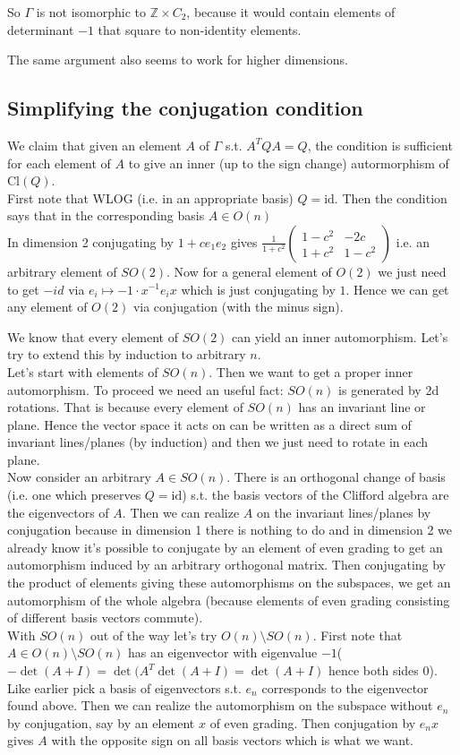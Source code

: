 \documentclass[a4paper]{article}
\begin{document}
So $\Gamma$ is not isomorphic to $\mathbb{Z} \times C_2$, because it would contain elements of determinant $-1$ that square to non-identity elements.

The same argument also seems to work for higher dimensions.

\subsection*{Simplifying the conjugation condition}
We claim that given an element $A$ of $\Gamma$ s.t. $A^{T}QA=Q$, the condition is sufficient for each element of $A$ to give an inner (up to the sign change) autormorphism of $\text{Cl}\left( Q \right)$.\\
First note that WLOG (i.e. in an appropriate basis) $Q=\text{id}$. Then the condition says that in the corresponding basis $A\in O(n)$\\
In dimension 2 conjugating by $1+c e_1e_2$ gives $\frac{1}{1+c^2} \begin{pmatrix}  1-c^2 & -2c\\1+c^2 & 1-c^2 \end{pmatrix}$ i.e. an arbitrary element of $SO(2)$. Now for a general element of $O(2)$ we just need to get $-id$ via  $e_i\mapsto -1\cdot x^{-1}e_i x$ which is just conjugating by $1$. Hence we can get any element of $O(2)$ via conjugation (with the minus sign).

We know that every element of $SO(2)$ can yield an inner automorphism. Let's try to extend this by induction to arbitrary $n$.\\
Let's start with elements of  $SO(n)$. Then we want to get a proper inner automorphism. To proceed we need an useful fact: $SO(n)$ is generated by 2d rotations. That is because every element of $SO(n)$ has an invariant line or plane. Hence the vector space it acts on can be written as a direct sum of invariant lines/planes (by induction) and then we just need to rotate in each plane.\\
Now consider an arbitrary $A\in SO(n)$.
There is an orthogonal change of basis (i.e. one which preserves $Q=\text{id}$) s.t. the basis vectors of the Clifford algebra are the eigenvectors of $A$. Then we can realize $A$ on the invariant lines/planes by conjugation because in dimension 1 there is nothing to do and in dimension 2 we already know it's possible to conjugate by an element of even grading to get an automorphism induced by an arbitrary orthogonal matrix. Then conjugating by the product of elements giving these automorphisms on the subspaces, we get an automorphism of the whole algebra (because elements of even grading consisting of different basis vectors commute).\\
With $SO(n)$ out of the way let's try $O(n)\setminus SO(n)$. First note that $A\in O(n)\setminus SO(n)$ has an eigenvector with eigenvalue $-1$( $-\det(A+I)=\det(A^{T}\det(A+I)=\det(A+I)$ hence both sides 0). Like earlier pick a basis of eigenvectors s.t. $e_n$ corresponds to the eigenvector found above. Then we can realize the automorphism on the subspace without $e_n$ by conjugation, say by an element $x$ of even grading. Then conjugation by $e_n x$ gives $A$ with the opposite sign on all basis vectors which is what we want.
\end{document}

